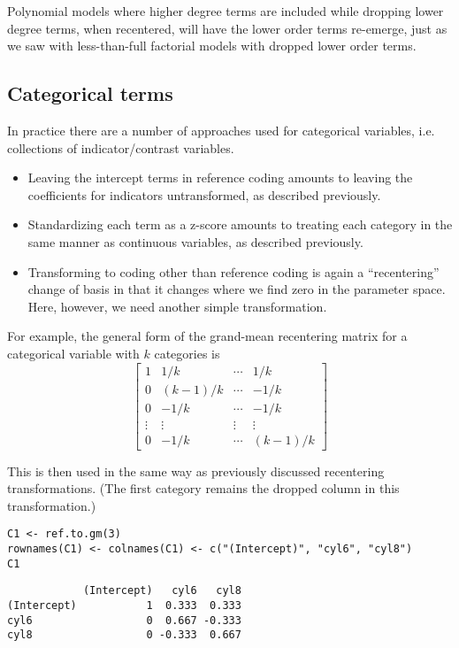 \documentclass[]{article}
\providecommand{\tightlist}{%
  \setlength{\itemsep}{0pt}\setlength{\parskip}{0pt}}
\begin{document}
Polynomial models where higher degree terms are included while dropping
lower degree terms, when recentered, will have the lower order terms
re-emerge, just as we saw with less-than-full factorial models with
dropped lower order terms.

\subsection{Categorical terms}\label{categorical-terms}

In practice there are a number of approaches used for categorical
variables, i.e. collections of indicator/contrast variables.

\begin{itemize}
\tightlist
\item
  Leaving the intercept terms in reference coding amounts to leaving the
  coefficients for indicators untransformed, as described previously.
\item
  Standardizing each term as a z-score amounts to treating each category
  in the same manner as continuous variables, as described previously.
\item
  Transforming to coding other than reference coding is again a
  ``recentering'' change of basis in that it changes where we find zero
  in the parameter space.\\
  Here, however, we need another simple transformation.
\end{itemize}

For example, the general form of the grand-mean recentering matrix for a
categorical variable with \(k\) categories is \[
\begin{bmatrix}
1 &1/k     &\cdots &1/k \\
0 &(k-1)/k &\cdots &-1/k \\
0 &-1/k    &\cdots &-1/k \\
\vdots &\vdots &\vdots &\vdots \\
0 &-1/k    &\cdots &(k-1)/k
\end{bmatrix}
\]

This is then used in the same way as previously discussed recentering
transformations. (The first category remains the dropped column in this
transformation.)

\begin{verbatim}
C1 <- ref.to.gm(3)
rownames(C1) <- colnames(C1) <- c("(Intercept)", "cyl6", "cyl8")
C1
\end{verbatim}

\begin{verbatim}
            (Intercept)   cyl6   cyl8
(Intercept)           1  0.333  0.333
cyl6                  0  0.667 -0.333
cyl8                  0 -0.333  0.667
\end{verbatim}
\end{document}
